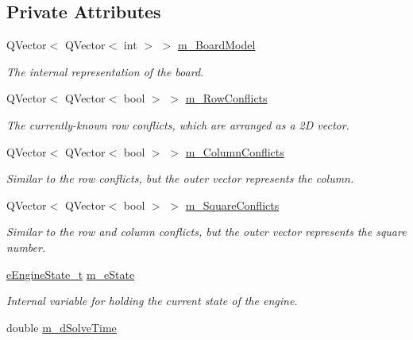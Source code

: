 \subsection*{Private Attributes}
\begin{DoxyCompactItemize}
\item 
Q\+Vector$<$ Q\+Vector$<$ int $>$ $>$ \mbox{\hyperlink{class_solver_engine_a8492d43cc29ddd63325be3f2ea9ee647}{m\+\_\+\+Board\+Model}}
\begin{DoxyCompactList}\small\item\em The internal representation of the board. \end{DoxyCompactList}\item 
Q\+Vector$<$ Q\+Vector$<$ bool $>$ $>$ \mbox{\hyperlink{class_solver_engine_ab2c80d6912f12a59297ff17788eb15ff}{m\+\_\+\+Row\+Conflicts}}
\begin{DoxyCompactList}\small\item\em The currently-\/known row conflicts, which are arranged as a 2D vector. \end{DoxyCompactList}\item 
Q\+Vector$<$ Q\+Vector$<$ bool $>$ $>$ \mbox{\hyperlink{class_solver_engine_a31443447551a97647ac50f4090c51a3f}{m\+\_\+\+Column\+Conflicts}}
\begin{DoxyCompactList}\small\item\em Similar to the row conflicts, but the outer vector represents the column. \end{DoxyCompactList}\item 
Q\+Vector$<$ Q\+Vector$<$ bool $>$ $>$ \mbox{\hyperlink{class_solver_engine_aec86ecb1c83357d184390a878feca082}{m\+\_\+\+Square\+Conflicts}}
\begin{DoxyCompactList}\small\item\em Similar to the row and column conflicts, but the outer vector represents the square number. \end{DoxyCompactList}\item 
\mbox{\hyperlink{class_solver_engine_acd25f3521e492d4aa924f922396bf02c}{e\+Engine\+State\+\_\+t}} \mbox{\hyperlink{class_solver_engine_a5a5852eb51ce8b9c23daa43295b056a8}{m\+\_\+e\+State}}
\begin{DoxyCompactList}\small\item\em Internal variable for holding the current state of the engine. \end{DoxyCompactList}\item 
double \mbox{\hyperlink{class_solver_engine_a0abb18c17bb48fafff933fcf68ce6bbc}{m\+\_\+d\+Solve\+Time}}

\end{DoxyCompactItemize}
